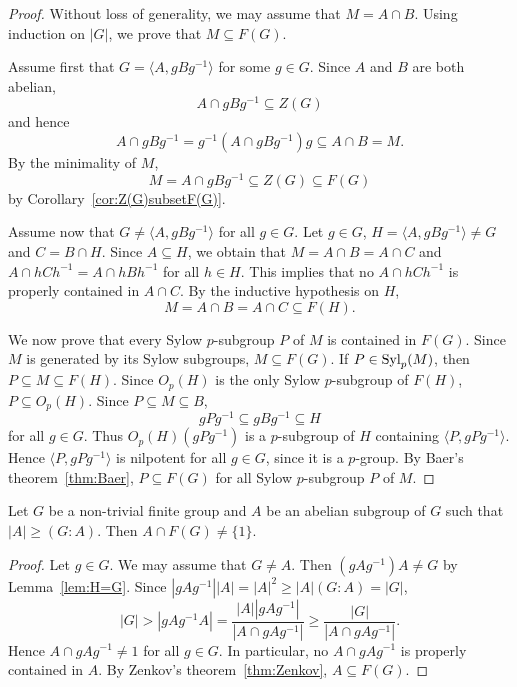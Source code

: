 \begin{proof}
	Without loss of generality, we may assume that $M=A\cap B$. Using induction on 
	$|G|$, we prove that $M\subseteq F(G)$.

	Assume first that $G=\langle A,gBg^{-1}\rangle$ for some $g\in G$. Since $A$
	and $B$ are both abelian, 
 \[
 A\cap gBg^{-1}\subseteq Z(G)
 \]
 and hence 
	\[
		A\cap gBg^{-1}=g^{-1}(A\cap gBg^{-1})g\subseteq A\cap B=M.
	\]
	By the minimality of $M$, 
    \[
    M=A\cap gBg^{-1}\subseteq Z(G)\subseteq F(G)
    \]
	by Corollary~\ref{cor:Z(G)subsetF(G)}.

	Assume now that $G\ne \langle A,gBg^{-1}\rangle$ for all $g\in G$.
	Let $g\in G$, $H=\langle A,gBg^{-1}\rangle\ne G$ and $C=B\cap H$.
	Since $A\subseteq H$, we obtain that 
 	$M=A\cap B=A\cap C$ and 
	$A\cap hCh^{-1}=A\cap hBh^{-1}$
	for all $h\in H$. This implies that no 
	$A\cap hCh^{-1}$ is properly contained in $A\cap C$. 
    By the inductive hypothesis on $H$, 
 	\[
		M=A\cap B=A\cap C\subseteq F(H).
	\]

    We now prove that every Sylow $p$-subgroup $P$ of $M$ is contained in $F(G)$. 
	Since $M$ is generated by its Sylow subgroups, 
    $M\subseteq F(G)$.
	If $P\in\mathrm{Syl}_p(M)$, then $P\subseteq M\subseteq F(H)$. Since $O_p(H)$ is 
    the only Sylow $p$-subgroup of $F(H)$, $P\subseteq O_p(H)$. Since 
	$P\subseteq M\subseteq B$, 
	\[
	gPg^{-1}\subseteq gBg^{-1}\subseteq H
	\]
	for all $g\in G$. Thus $O_p(H)(gPg^{-1})$ is a $p$-subgroup of $H$ containing 
	$\langle P,gPg^{-1}\rangle$. Hence $\langle P,gPg^{-1}\rangle$
	is nilpotent for all $g\in G$, since it is a $p$-group. By Baer's theorem~\ref{thm:Baer}, 
    $P\subseteq F(G)$ for all Sylow $p$-subgroup $P$ of $M$. 
\end{proof}

\begin{corollary}
	\label{cor:Zenkov}
	Let $G$ be a non-trivial finite group and $A$ be an abelian subgroup of $G$ such that 
 	$|A|\geq(G:A)$. Then $A\cap F(G)\ne\{1\}$.
\end{corollary}

\begin{proof}
	Let $g\in G$. We may assume that $G\ne A$. Then $(gAg^{-1})A\ne G$ by Lemma~\ref{lem:H=G}. Since 
	$|gAg^{-1}||A|=|A|^2\geq |A|(G:A)=|G|$, 
	\[
		|G|>|gAg^{-1}A|
		=\frac{|A||gAg^{-1}|}{|A\cap gAg^{-1}|}
		\geq \frac{|G|}{|A\cap gAg^{-1}|}.
	\]
	Hence $A\cap gAg^{-1}\ne 1$ for all $g\in G$. In particular, no
	$A\cap gAg^{-1}$ is properly contained in $A$. By 
	Zenkov's theorem~\ref{thm:Zenkov}, $A\subseteq F(G)$.
\end{proof}

